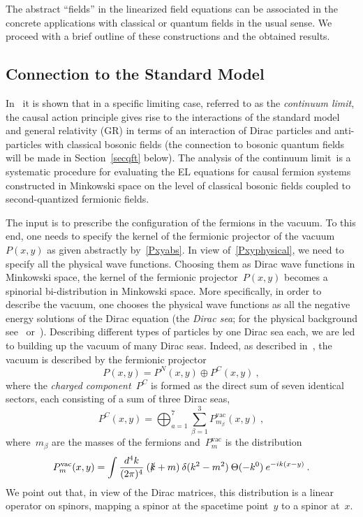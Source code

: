 \documentclass[reqno,11pt]{amsart}
\numberwithin{equation}{section}
\newcommand{\beq}{\begin{equation}}
\newcommand{\eeq}{\end{equation}}
\newcommand{\1}{\mbox{\rm 1 \hspace{-1.05 em} 1}}
\begin{document}
The abstract ``fields'' in the linearized field equations can be associated in the concrete applications with
classical or quantum fields in the usual sense. We proceed with a brief outline of these constructions
and the obtained results.

\subsection{Connection to the Standard Model} \label{seccfssm}
In~\cite[Chapter~5]{cfs} it is shown that in a specific limiting case, referred to as the {\em{continuum limit}},
the causal action principle gives rise to the interactions of the standard model and general relativity (GR)
in terms of an interaction of Dirac particles and anti-particles with classical bosonic fields
(the connection to bosonic quantum fields will be made in Section~\ref{secqft} below).
The analysis of the continuum limit is a systematic procedure for evaluating the EL equations for causal fermion systems constructed in Minkowski space on the level of classical bosonic fields
coupled to second-quantized fermionic fields.

The input is to prescribe the configuration of the fermions in the vacuum.
To this end, one needs to specify the kernel of the fermionic projector of the vacuum~$P(x,y)$
as given abstractly by~\eqref{Pxyabs}.
In view of~\eqref{Pxyphysical}, we need to specify all the physical wave functions. 
Choosing them as Dirac wave functions in Minkowski space, the
kernel of the fermionic projector~$P(x,y)$ becomes a spinorial bi-distribution in Minkowski space.
More specifically, in order to describe the vacuum, one chooses the physical wave functions
as all the negative energy solutions of the Dirac equation (the {\em{Dirac sea}}; for the physical
background see~\cite[Section~1.5]{intro} or~\cite[Chapter~1]{cfs}).
Describing different types of particles by one Dirac sea each, we are led to
building up the vacuum of many Dirac seas.
Indeed, as described in~\cite[Chapter~5]{cfs}, the vacuum is described by the fermionic projector
\beq \label{Pvac}
P(x,y) = P^N(x,y) \oplus P^C(x,y) \:,
\eeq
where the {\em{charged component}}~$P^C$ is formed as the direct sum of seven
identical sectors, each consisting of a sum of three Dirac seas,
\beq \label{PC}
P^C(x,y) = \bigoplus_{a=1}^7 \sum_{\beta=1}^3 P^\text{vac}_{m_\beta}(x,y) \:,
\eeq
where~$m_\beta$ are the masses of the fermions and~$P^\text{vac}_m$ is the distribution
\beq \label{Psea}
P^\text{vac}_m(x,y) = \int \frac{d^4k}{(2 \pi)^4}\: (\slashed{k}+m)\: \delta(k^2-m^2)\: \Theta(-k^0)\: e^{-ik(x-y)}\:.
\eeq
We point out that, in view of the Dirac matrices, this distribution is a linear operator on spinors,
mapping a spinor at the spacetime point~$y$ to a spinor at~$x$.
\end{document}
